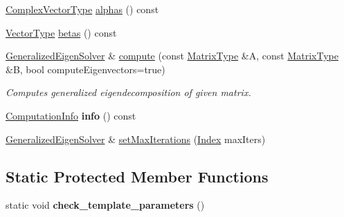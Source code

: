 \begin{DoxyCompactItemize}
\mbox{\hyperlink{class_eigen_1_1_generalized_eigen_solver_acfd144329aca76882069da2fc5d53ef5}{Complex\+Vector\+Type}} \mbox{\hyperlink{class_eigen_1_1_generalized_eigen_solver_a82b1bc41267f46e5c5899d5b084a73bb}{alphas}} () const
\item 
\mbox{\hyperlink{class_eigen_1_1_generalized_eigen_solver_a5aa3d1390c2b0d455c1c9b8b3101b119}{Vector\+Type}} \mbox{\hyperlink{class_eigen_1_1_generalized_eigen_solver_abeaa6f56cee367b83fd09d428462ca0c}{betas}} () const
\item 
\mbox{\hyperlink{class_eigen_1_1_generalized_eigen_solver}{Generalized\+Eigen\+Solver}} \& \mbox{\hyperlink{class_eigen_1_1_generalized_eigen_solver_a275910b47dfe5f40211dcb59cfd68f3c}{compute}} (const \mbox{\hyperlink{class_eigen_1_1_generalized_eigen_solver_a56f4b9823bb9a267de3aaf48428cd247}{Matrix\+Type}} \&A, const \mbox{\hyperlink{class_eigen_1_1_generalized_eigen_solver_a56f4b9823bb9a267de3aaf48428cd247}{Matrix\+Type}} \&B, bool compute\+Eigenvectors=true)
\begin{DoxyCompactList}\small\item\em Computes generalized eigendecomposition of given matrix. \end{DoxyCompactList}\item 
\mbox{\label{class_eigen_1_1_generalized_eigen_solver_aad204fd80e2633d5693b78916bcda40c}} 
\mbox{\hyperlink{group__enums_ga85fad7b87587764e5cf6b513a9e0ee5e}{Computation\+Info}} {\bfseries info} () const
\item 
\mbox{\hyperlink{class_eigen_1_1_generalized_eigen_solver}{Generalized\+Eigen\+Solver}} \& \mbox{\hyperlink{class_eigen_1_1_generalized_eigen_solver_a2a6f96bd042068cfc0eafba839b424bd}{set\+Max\+Iterations}} (\mbox{\hyperlink{class_eigen_1_1_generalized_eigen_solver_a46a0ff3841059479ec314e56a5645302}{Index}} max\+Iters)
\end{DoxyCompactItemize}
\subsection*{Static Protected Member Functions}
\begin{DoxyCompactItemize}
\item 
\mbox{\label{class_eigen_1_1_generalized_eigen_solver_a8540388c4be7dbdd1da819e1a84d3a64}} 
static void {\bfseries check\+\_\+template\+\_\+parameters} ()
\end{DoxyCompactItemize}
